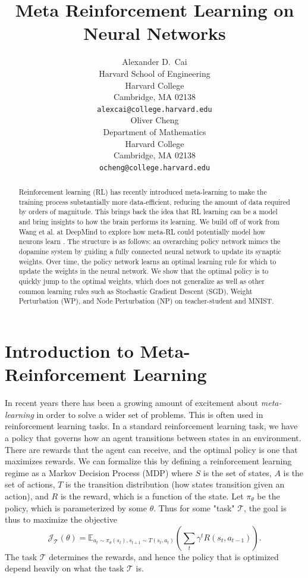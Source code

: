 \documentclass{article}
\title{Meta Reinforcement Learning on Neural Networks}
\author{%
  Alexander D.~Cai \\
  Harvard School of Engineering\\
  Harvard College \\
  Cambridge, MA 02138 \\
  \texttt{alexcai@college.harvard.edu} \\
  \And
  Oliver Cheng \\
  Department of Mathematics \\
  Harvard College \\
  Cambridge, MA 02138 \\
  \texttt{ocheng@college.harvard.edu} \\
}
\begin{document}
\maketitle

\begin{abstract}
  Reinforcement learning (RL) has recently introduced meta-learning to make the training process substantially more data-efficient, reducing the 
  amount of data required by orders of magnitude. This brings back the idea that RL learning can
  be a model and bring insights to how the brain performs its learning. We build off of work from Wang et al.
  at DeepMind to explore how meta-RL could potentially model how neurons learn \cite{wang2018pfc}. The structure is as follows: an overarching policy network mimcs the dopamine system by guiding a fully connected neural network to 
  update its synaptic weights. Over time, the policy network learns an optimal learning rule for which to update
  the weights in the neural network. We show that the optimal policy is to quickly jump to the optimal weights, which does
  not generalize as well as other common learning rules such as Stochastic Gradient Descent (SGD), Weight Perturbation (WP), and Node Perturbation (NP) on teacher-student and MNIST.
\end{abstract}
\section{Introduction to Meta-Reinforcement Learning}

In recent years there has been a growing amount of excitement about 
\textit{meta-learning} in order to solve a wider set of problems. This is 
often used in reinforcement learning tasks. In a standard reinforcement
 learning task, we have a policy that governs how an agent transitions 
between states in an environment. There are rewards that the agent can 
receive, and the optimal policy is one that maximizes rewards. We can 
formalize this by defining a reinforcement learning regime as a Markov 
Decision Process (MDP) where $S$ is the set of states, $A$ is the set 
of actions, $T$ is the transition distribution (how states transition given 
an action), and $R$ is the reward, which is a function of the state. Let 
$\pi_\theta$ be the policy, which is parameterized by some $\theta$. 
Thus for some "task" $\mathcal{T}$, the goal is thus to maximize the objective 
\[ \mathcal{J}_{\mathcal{T}}(\theta) = \mathbb{E}_{a_t \sim \pi_\theta(s_t), s_{t+1}
 \sim T(s_t, a_t)} \left( \sum_t \gamma^t R(s_t, a_{t-1}) \right).\]
The task $\mathcal{T}$ determines the rewards, and hence the policy that is optimized 
depend heavily on what the task $\mathcal{T}$ is. 
\end{document}
